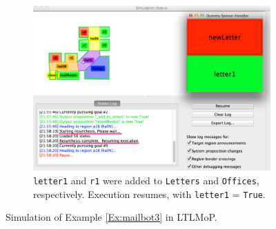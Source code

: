 \begin{figure}[h]
	\vspace{4 pt}
	\begin{subfigure}[b]{0.99\columnwidth}
	\includegraphics[width=0.99\columnwidth, clip]{./img/sim3.jpg}
	\caption{\texttt{letter1} and \texttt{r1} were added to \texttt{Letters} and \texttt{Offices}, respectively. Execution resumes, with \texttt{letter1} = \texttt{True}.} 
	\label{Fig:sim3}
	\end{subfigure}
	\caption{Simulation of Example \ref{Ex:mailbot3} in LTLMoP.}\label{Fig:sim}
\end{figure}


